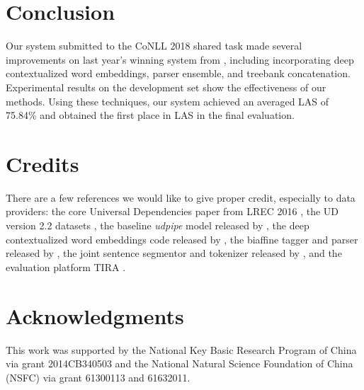 \documentclass[11pt,a4paper]{article}
\begin{document}
\section{Conclusion}

Our system submitted to the CoNLL 2018 shared task made several improvements
on last year's winning system from \citet{dozat-qi-manning:2017:K17-3},
including incorporating deep contextualized word embeddings,
parser ensemble, and treebank concatenation.
Experimental results on the development set show the effectiveness of our methods.
Using  these techniques, our system achieved an averaged LAS of 75.84\%
and obtained the first place in LAS in the final evaluation.

\section{Credits}

There are a few references we would like to
give proper credit, especially to data providers:
the core Universal Dependencies paper from LREC 2016 \cite{ud},
the UD version 2.2 datasets \cite{ud22testdata}, 
the baseline \textit{udpipe} model released by \citet{udpipe},
the deep contextualized word embeddings code released by \citet{N18-1202},
the biaffine tagger and parser released by \citet{dozat-qi-manning:2017:K17-3},
the joint sentence segmentor and tokenizer released by \citet{delhoneux-EtAl:2017:K17-3},
and the evaluation platform TIRA \cite{tira}.

\section*{Acknowledgments}
This work was supported by the National Key Basic Research Program of China
via grant 2014CB340503 and the National Natural Science Foundation of China (NSFC)
via grant 61300113 and 61632011.



\end{document}
